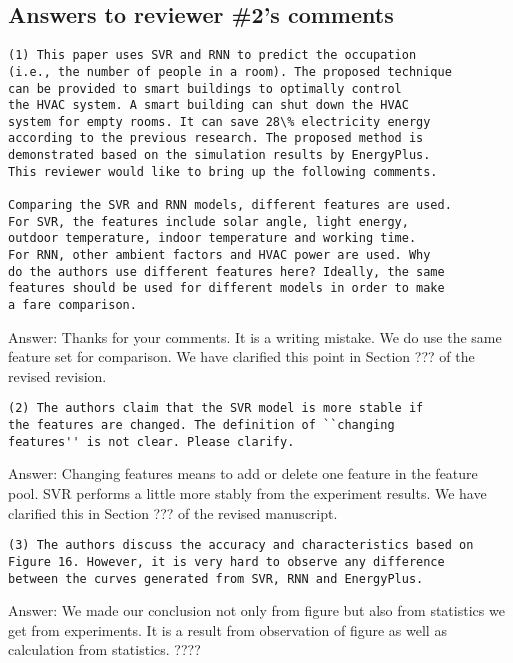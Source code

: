 \subsection{Answers to reviewer \#2's comments}
\begin{verbatim}
(1) This paper uses SVR and RNN to predict the occupation
(i.e., the number of people in a room). The proposed technique
can be provided to smart buildings to optimally control
the HVAC system. A smart building can shut down the HVAC
system for empty rooms. It can save 28\% electricity energy
according to the previous research. The proposed method is
demonstrated based on the simulation results by EnergyPlus.
This reviewer would like to bring up the following comments.

Comparing the SVR and RNN models, different features are used.
For SVR, the features include solar angle, light energy,
outdoor temperature, indoor temperature and working time.
For RNN, other ambient factors and HVAC power are used. Why
do the authors use different features here? Ideally, the same
features should be used for different models in order to make
a fare comparison.
\end{verbatim}

Answer:
Thanks for your comments. It is a writing mistake. We do use the same feature
set for comparison. We have clarified this point in Section ??? of the revised
revision.

\begin{verbatim}
(2) The authors claim that the SVR model is more stable if
the features are changed. The definition of ``changing
features'' is not clear. Please clarify.
\end{verbatim}

Answer: Changing features means to add or delete one feature in the feature pool. SVR
performs a little more stably from the experiment results. We have clarified
this in Section ??? of the revised manuscript.

\begin{verbatim}
(3) The authors discuss the accuracy and characteristics based on
Figure 16. However, it is very hard to observe any difference
between the curves generated from SVR, RNN and EnergyPlus.
\end{verbatim}

Answer: We made our conclusion not only from figure but also from statistics we get
from experiments. It is a result from observation of figure as well as
calculation from statistics. ????

